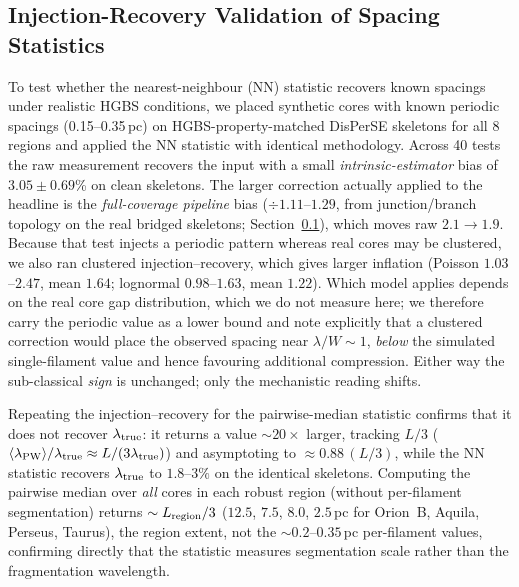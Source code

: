 \documentclass[usenatbib,twoside,twocolumn]{mnras}
\begin{document}
\subsection{Injection-Recovery Validation of Spacing Statistics}
\label{sec:injection_recovery}

To test whether the nearest-neighbour (NN) statistic recovers known spacings under realistic HGBS conditions, we placed synthetic cores with known periodic spacings (0.15--0.35\,pc) on HGBS-property-matched DisPerSE skeletons for all 8 regions and applied the NN statistic with identical methodology. Across 40 tests the raw measurement recovers the input with a small \emph{intrinsic-estimator} bias of $3.05 \pm 0.69$\% on clean skeletons. The larger correction actually applied to the headline is the \emph{full-coverage pipeline} bias ($\div1.11$--$1.29$, from junction/branch topology on the real bridged skeletons; Section~\ref{sec:injection_recovery}), which moves raw $2.1\to1.9$. Because that test injects a periodic pattern whereas real cores may be clustered, we also ran clustered injection--recovery, which gives larger inflation (Poisson $1.03$--$2.47$, mean $1.64$; lognormal $0.98$--$1.63$, mean $1.22$). Which model applies depends on the real core gap distribution, which we do not measure here; we therefore carry the periodic value as a lower bound and note explicitly that a clustered correction would place the observed spacing near $\lambda/W\sim1$, \emph{below} the simulated single-filament value and hence favouring additional compression. Either way the sub-classical \emph{sign} is unchanged; only the mechanistic reading shifts.

Repeating the injection--recovery for the pairwise-median statistic confirms that it does not recover $\lambda_{\rm true}$: it returns a value $\sim$$20\times$ larger, tracking $L/3$ ($\langle\lambda_{\rm PW}\rangle/\lambda_{\rm true}\approx L/(3\lambda_{\rm true})$) and asymptoting to $\approx0.88\,(L/3)$, while the NN statistic recovers $\lambda_{\rm true}$ to $1.8$--$3\%$ on the identical skeletons. Computing the pairwise median over \emph{all} cores in each robust region (without per-filament segmentation) returns $\sim L_{\rm region}/3$ ($12.5$, $7.5$, $8.0$, $2.5$\,pc for Orion~B, Aquila, Perseus, Taurus), the region extent, not the $\sim0.2$--$0.35$\,pc per-filament values, confirming directly that the statistic measures segmentation scale rather than the fragmentation wavelength.
\end{document}
